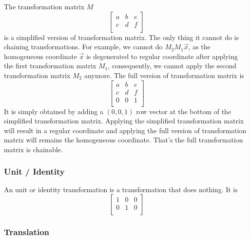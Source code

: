 \documentclass{note}
\begin{document}
\begin{note}
    The transformation matrix $M$
    \begin{equation*}
        \begin{bmatrix}
            a & b & e \\
            c & d & f \\
        \end{bmatrix}
    \end{equation*}
    is a simplified version of transformation matrix. The only thing it cannot do is chaining transformations. For example, we cannot do $M_2 M_1 \vec{x}$, as the homogeneous coordinate $\vec{x}$ is degenerated to regular coordinate after applying the first transformation matrix $M_1$, consequently, we cannot apply the second transformation matrix $M_2$ anymore. The full version of transformation matrix is
    \begin{equation*}
        \begin{bmatrix}
            a & b & e \\
            c & d & f \\
            0 & 0 & 1 \\
        \end{bmatrix}
    \end{equation*}
    It is simply obtained by adding a $(0, 0, 1)$ row vector at the bottom of the simplified transformation matrix. Applying the simplified transformation matrix will result in a regular coordinate and applying the full version of transformation matrix will remains the homogeneous coordinate. That's the full transformation matrix is chainable.
\end{note}

\subsubsection{Unit / Identity}

An unit or identity transformation is a transformation that does nothing. It is
\begin{equation*}
    \begin{bmatrix}
        1 & 0 & 0 \\
        0 & 1 & 0 \\
    \end{bmatrix}
\end{equation*}

\subsubsection{Translation}
\end{document}
